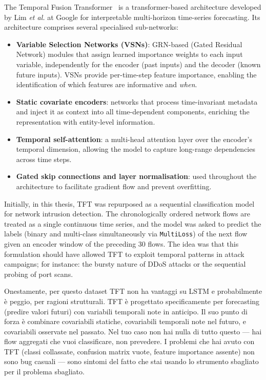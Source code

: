 

The Temporal Fusion Transformer~\supercite{lim2021temporal} is a transformer-based architecture developed by Lim \emph{et al.} at Google for interpretable multi-horizon time-series forecasting.  Its architecture comprises several specialised sub-networks:

\begin{itemize}
    \item \textbf{Variable Selection Networks (VSNs)}: GRN-based (Gated
          Residual Network) modules that assign learned importance weights to
          each input variable, independently for the encoder (past inputs) and
          the decoder (known future inputs).  VSNs provide per-time-step
          feature importance, enabling the identification of which features are
          informative and \emph{when}.
    \item \textbf{Static covariate encoders}: networks that process
          time-invariant metadata and inject it as context into all
          time-dependent components, enriching the representation with
          entity-level information.
    \item \textbf{Temporal self-attention}: a multi-head attention layer over
          the encoder's temporal dimension, allowing the model to capture
          long-range dependencies across time steps.
    \item \textbf{Gated skip connections and layer normalisation}: used
          throughout the architecture to facilitate gradient flow and prevent
          overfitting.
\end{itemize}

Initially, in this thesis, TFT was repurposed as a sequential classification model for network intrusion detection. The chronologically ordered network flows are treated as a single continuous time series, and the model was asked to predict the labels (binary and multi-class simultaneously via \texttt{MultiLoss}) of the next flow given an encoder window of the preceding 30 flows.  The idea was that this formulation should have allowed TFT to exploit temporal patterns in attack campaigns; for instance: the bursty nature of DDoS attacks or the sequential probing of port scans.


Onestamente, per questo dataset TFT non ha vantaggi su LSTM e probabilmente è peggio, per ragioni strutturali.
TFT è progettato specificamente per forecasting (predire valori futuri) con variabili temporali note in anticipo. Il suo punto di forza è combinare covariabili statiche, covariabili temporali note nel futuro, e covariabili osservate nel passato. Nel tuo caso non hai nulla di tutto questo — hai flow aggregati che vuoi classificare, non prevedere.
I problemi che hai avuto con TFT (classi collassate, confusion matrix vuote, feature importance assente) non sono bug casuali — sono sintomi del fatto che stai usando lo strumento sbagliato per il problema sbagliato.

